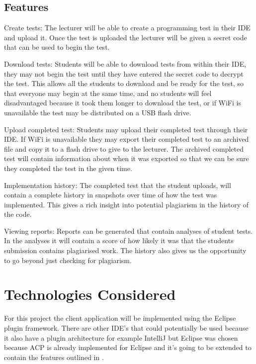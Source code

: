 \documentclass[twocolumn]{article}
\begin{document}
\subsection{Features} \label{sec:Features}
Create tests: The lecturer will be able to create a programming test in their
IDE and upload it. Once the test is uploaded the lecturer will be given a secret
code that can be used to begin the test.

Download tests: Students will be able to download tests from within their IDE,
they may not begin the test until they have entered the secret code to decrypt
the test. This allows all the students to download and be ready for the test, so
that everyone may begin at the same time, and no students will feel
disadvantaged because it took them longer to download the test, or if WiFi is
unavailable the test may be distributed on a USB flash drive.

Upload completed test: Students may upload their completed test through their
IDE. If WiFi is unavailable they may export their completed test to an archived
file and copy it to a flash drive to give to the lecturer. The archived
completed test will contain information about when it was exported so that we
can be sure they completed the test in the given time.

Implementation history: The completed test that the student uploads, will
contain a complete history in snapshots over time of how the test was
implemented. This gives a rich insight into potential plagiarism in the history
of the code.

Viewing reports: Reports can be generated that contain analyses of student
tests. In the analyses it will contain a score of how likely it was that the
students submission contains plagiarised work. The history also gives us the
opportunity to go beyond just checking for plagiarism.

\section{Technologies Considered}
For this project the client application will be implemented using the Eclipse
plugin framework. There are other IDE's that could potentially be used because
it also have a plugin architecture for example IntelliJ but Eclipse was chosen
because ACP is already implemented for Eclipse and it's going to be extended to
contain the features outlined in .
\end{document}
